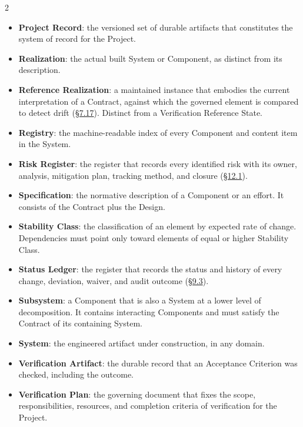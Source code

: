 \begin{multicols}{2}
\begin{itemize}
\item \textbf{Project Record}: the versioned set of durable artifacts that constitutes the system of record for the Project.

\item \textbf{Realization}: the actual built System or Component, as distinct from its description.

\item \textbf{Reference Realization}: a maintained instance that embodies the current interpretation of a Contract, against which the governed element is compared to detect drift (\hyperlink{nss-7.17}{\S7.17}). Distinct from a Verification Reference State.

\item \textbf{Registry}: the machine-readable index of every Component and content item in the System.

\item \textbf{Risk Register}: the register that records every identified risk with its owner, analysis, mitigation plan, tracking method, and closure (\hyperlink{nss-12.1}{\S12.1}).

\item \textbf{Specification}: the normative description of a Component or an effort. It consists of the Contract plus the Design.

\item \textbf{Stability Class}: the classification of an element by expected rate of change. Dependencies must point only toward elements of equal or higher Stability Class.

\item \textbf{Status Ledger}: the register that records the status and history of every change, deviation, waiver, and audit outcome (\hyperlink{nss-9.3}{\S9.3}).

\item \textbf{Subsystem}: a Component that is also a System at a lower level of decomposition. It contains interacting Components and must satisfy the Contract of its containing System.

\item \textbf{System}: the engineered artifact under construction, in any domain.

\item \textbf{Verification Artifact}: the durable record that an Acceptance Criterion was checked, including the outcome.

\item \textbf{Verification Plan}: the governing document that fixes the scope, responsibilities, resources, and completion criteria of verification for the Project.


\end{itemize}
\end{multicols}
